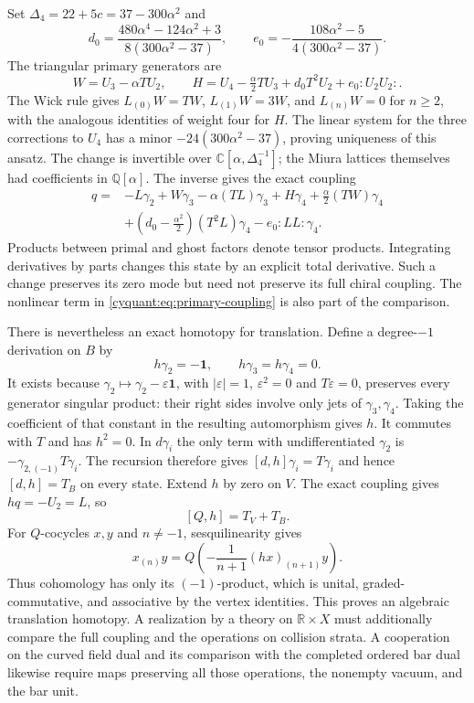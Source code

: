 Set $\Delta_4=22+5c=37-300\alpha^2$ and
\[
 d_0=\frac{480\alpha^4-124\alpha^2+3}{8(300\alpha^2-37)},\qquad
 e_0=-\frac{108\alpha^2-5}{4(300\alpha^2-37)}.
\]
The triangular primary generators are
\[
 W=U_3-\alpha TU_2,\qquad
 H=U_4-\tfrac\alpha2TU_3+d_0T^2U_2+e_0{:}U_2U_2{:}.
\]
The Wick rule gives $L_{(0)}W=TW$, $L_{(1)}W=3W$, and
$L_{(n)}W=0$ for $n\geq2$, with the analogous identities of
weight four for $H$.  The linear system
for the three corrections to $U_4$ has a minor
$-24(300\alpha^2-37)$, proving uniqueness of this ansatz.  The change
is invertible over $\mathbb C[\alpha,\Delta_4^{-1}]$; the Miura
lattices themselves had coefficients in $\mathbb Q[\alpha]$.
The inverse gives the exact coupling
\begin{equation}\label{cyquant:eq:primary-coupling}
 \begin{aligned}
 q={}&-L\gamma_2+W\gamma_3-\alpha(TL)\gamma_3
       +H\gamma_4+\tfrac\alpha2(TW)\gamma_4\\
 &+(d_0-\tfrac{\alpha^2}{2})(T^2L)\gamma_4
          -e_0{:}LL{:}\gamma_4.
 \end{aligned}
\end{equation}
Products between primal and ghost factors denote tensor products.
Integrating derivatives by parts changes this state by an explicit
total derivative.  Such a change preserves its zero mode but need
not preserve its full chiral coupling.  The nonlinear term in
\eqref{cyquant:eq:primary-coupling} is also part of the comparison.

There is nevertheless an exact homotopy for translation.  Define a
degree-$-1$ derivation on $B$ by
\[
 h\gamma_2=-\mathbf1,\qquad h\gamma_3=h\gamma_4=0.
\]
It exists because $\gamma_2\mapsto\gamma_2-\varepsilon\mathbf1$,
with $|\varepsilon|=1$, $\varepsilon^2=0$ and $T\varepsilon=0$, preserves
every generator singular product: their right sides involve only jets
of $\gamma_3,\gamma_4$.  Taking the coefficient of that constant in
the resulting automorphism gives $h$.  It commutes with $T$ and has
$h^2=0$.
In $d\gamma_i$ the only term with undifferentiated $\gamma_2$ is
$-\gamma_{2,(-1)}T\gamma_i$.  The recursion therefore gives
$[d,h]\gamma_i=T\gamma_i$ and hence $[d,h]=T_B$ on every state.
Extend $h$ by zero on $V$.  The exact coupling gives $hq=-U_2=L$,
so
\begin{equation}\label{cyquant:eq:cartan}
 [Q,h]=T_V+T_B.
\end{equation}
For $Q$-cocycles $x,y$ and $n\ne-1$, sesquilinearity gives
\[
 x_{(n)}y
 =Q\left(-\frac1{n+1}(hx)_{(n+1)}y\right).
\]
Thus cohomology has only its $(-1)$-product, which is unital,
graded-commutative, and associative by the vertex identities.
This proves an algebraic translation homotopy.  A realization by a
theory on $\mathbb R\times X$ must additionally compare the full
coupling and the operations on collision strata.  A cooperation on
the curved field dual and its comparison with the completed ordered
bar dual likewise require maps preserving all those operations, the
nonempty vacuum, and the bar unit.

